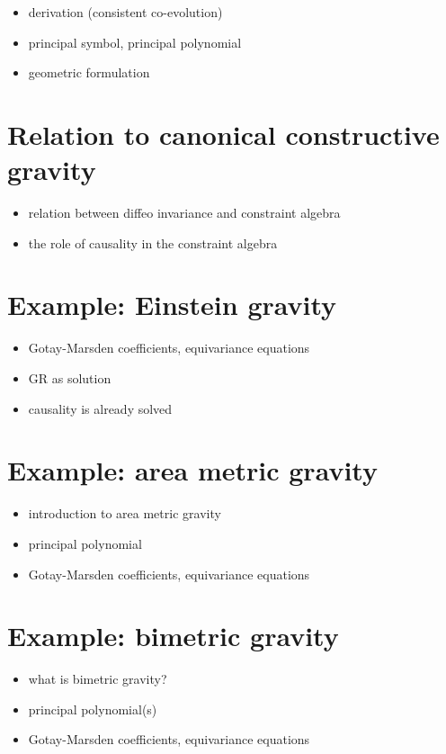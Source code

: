 \begin{itemize}
\item derivation (consistent co-evolution)
\item principal symbol, principal polynomial
\item geometric formulation
\end{itemize}

\section{Relation to canonical constructive gravity}
\begin{itemize}
\item relation between diffeo invariance and constraint algebra
\item the role of causality in the constraint algebra
\end{itemize}

\section{Example: Einstein gravity}
\begin{itemize}
\item Gotay-Marsden coefficients, equivariance equations
\item GR as solution
\item causality is already solved
\end{itemize}

\section{Example: area metric gravity}
\begin{itemize}
\item introduction to area metric gravity
\item principal polynomial
\item Gotay-Marsden coefficients, equivariance equations
\end{itemize}

\section{Example: bimetric gravity}
\begin{itemize}
\item what is bimetric gravity?
\item principal polynomial(s)
\item Gotay-Marsden coefficients, equivariance equations
\end{itemize}


